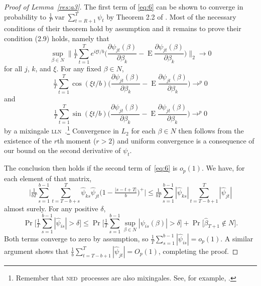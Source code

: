\documentclass[11pt,fleqn]{article}
\theoremstyle{definition}
\DeclareMathOperator{\E}{E}
\DeclareMathOperator{\var}{var}
\DeclareMathOperator{\pr}{Pr}
\newcommand{\osum}[1]{\sum_{#1=R+1}^T}
\newcommand{\lln}{\textsc{lln}}
\newcommand{\ned}{\textsc{ned}}
\begin{document}
\begin{proof}[Proof of Lemma~\ref{res:a3}]
  The first term of \eqref{eq:6} can be shown to converge in
  probability to $\tfrac{1}{P} \var \osum{t} \psi_t$ by Theorem 2.2 of
  \citet{JoD:00}.  Most of the necessary conditions of their theorem
  hold by assumption and it remains to prove their condition (2.9)
  holds, namely that
  \begin{equation}\label{eq:2}
    \sup_{\beta \in N} \Bigg\lVert \tfrac{1}{T} \sum_{t=1}^T e^{i \xi t/b} 
    \Bigg( \frac{\partial \psi_{jt}(\beta)}{\partial \beta_k} -
          \E \frac{\partial \psi_{jt}(\beta)}{\partial \beta_k} \Bigg) 
    \Bigg\rVert_2 \to 0
  \end{equation}
  for all $j$, $k$, and $\xi$.  For any fixed $\beta \in N$,
  \begin{equation*}
    \tfrac{1}{T} \sum_{t=1}^T \cos( \xi t / b )
    \Bigg( \frac{\partial \psi_{jt}(\beta)}{\partial \beta_k} -
          \E \frac{\partial \psi_{jt}(\beta)}{\partial \beta_k} \Bigg)
    \to^p 0
  \end{equation*}
  and
  \begin{equation*}
    \tfrac{1}{T} \sum_{t=1}^T \sin( \xi t / b )
    \Bigg( \frac{\partial \psi_{jt}(\beta)}{\partial \beta_k} -
          \E \frac{\partial \psi_{jt}(\beta)}{\partial \beta_k} \Bigg)
    \to^p 0
  \end{equation*}
  by a mixingale \lln\ \citep{Dav:93}.\footnote{Remember that \ned\
    processes are also mixingales.  See, for example, \citet[Section
    17.2]{Dav:94}.}  Convergence in $L_2$ for each $\beta \in N$ then
  follows from the existence of the $r$th moment ($r > 2$) and uniform
  convergence is a consequence of our bound on the second derivative
  of $\psi_t$.

  The conclusion then holds if the second term of~\eqref{eq:6} is
  $o_p(1)$.  We have, for each element of that matrix,
  \begin{equation*}
    \Big| \tfrac{1}{bT} \sum_{s = 1}^{b - 1} \sum_{t = T - b + s}^{T}
        \hat\psi_{ks} \hat\psi_{jt}
        \big(1 - \tfrac{\lvert s - t + T\rvert}{b}\big)^+ \Big| \leq
     \tfrac{1}{b T} \sum_{s = 1}^{b - 1} |\hat\psi_{ks}|
         \sum_{t = T - b + 1}^{T} | \hat\psi_{jt} |
  \end{equation*}
  almost surely.  For any positive $\delta$,
  \begin{equation*}
    \pr \Bigg[ \tfrac{1}{T} \sum_{s = 1}^{b - 1} | \hat\psi_{is} |
              > \delta \Bigg] \leq 
    \pr \Bigg[\tfrac{1}{T} \sum_{s = 1}^{b - 1} \sup_{ \beta \in N } | \psi_{is}( \beta ) |
              > \delta \Bigg] +
    \pr \big[ \hat \beta_{T+1} \notin N \big].
  \end{equation*}
  Both terms converge to zero by assumption, so $\tfrac{1}{T} \sum_{s
    = 1}^{b - 1} |\hat\psi_{is}| = o_p(1)$.  A similar
  argument shows that $\tfrac{1}{b} \sum_{t = T - b + 1}^{T} |
  \hat\psi_{jt} | = O_p(1)$, completing the proof.
\end{proof}
\end{document}
